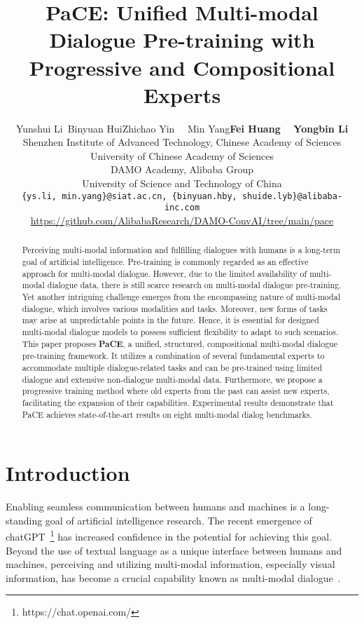 \documentclass[11pt]{article}
\title{PaCE: Unified Multi-modal Dialogue Pre-training with \\
Progressive and Compositional Experts}
\author{Yunshui Li\footnotemark[1]\ \footnotemark[2] \quad  Binyuan Hui\footnotemark[1] \quad Zhichao Yin \ \   Min Yang\footnotemark[3] \quad \textbf{Fei Huang} \ \  \textbf{Yongbin Li}\footnotemark[3] \\
        Shenzhen Institute of Advanced Technology, Chinese Academy of Sciences \\
        University of Chinese Academy of Sciences \\
        DAMO Academy, Alibaba Group\\
        University of Science and Technology of China\\
        \texttt{\{ys.li, min.yang\}@siat.ac.cn, \{binyuan.hby, shuide.lyb\}@alibaba-inc.com}\\
        \small\url{https://github.com/AlibabaResearch/DAMO-ConvAI/tree/main/pace}
        }
\begin{document}
\maketitle


\renewcommand{\thefootnote}{\fnsymbol{footnote}}

\renewcommand{\thefootnote}{\arabic{footnote}}

\begin{abstract}
Perceiving multi-modal information and fulfilling dialogues with humans is a long-term goal of artificial intelligence. Pre-training is commonly regarded as an effective approach for multi-modal dialogue. However, due to the limited availability of multi-modal dialogue data, there is still scarce research on multi-modal dialogue pre-training. Yet another intriguing challenge emerges from the encompassing nature of multi-modal dialogue, which involves various modalities and tasks. Moreover, new forms of tasks may arise at unpredictable points in the future. Hence, it is essential for designed multi-modal dialogue models to possess sufficient flexibility to adapt to such scenarios. 
This paper proposes \textbf{PaCE}, a unified, structured, compositional multi-modal dialogue pre-training framework. It utilizes a combination of several fundamental experts to accommodate multiple dialogue-related tasks and can be pre-trained using limited dialogue and extensive non-dialogue multi-modal data. Furthermore, we propose a progressive training method where old experts from the past can assist new experts, facilitating the expansion of their capabilities. 
Experimental results demonstrate that PaCE achieves state-of-the-art results on eight multi-modal dialog benchmarks.

\end{abstract}

\section{Introduction}


Enabling seamless communication between humans and machines is a long-standing goal of artificial intelligence research.
The recent emergence of chatGPT~\footnote{https://chat.openai.com/} has increased confidence in the potential for achieving this goal. 
Beyond the use of textual language as a unique interface between humans and machines, perceiving and utilizing multi-modal information, especially visual information, has become a crucial capability known as multi-modal dialogue~\citep{shuster2020multi,sun2021multimodal}.
\end{document}
